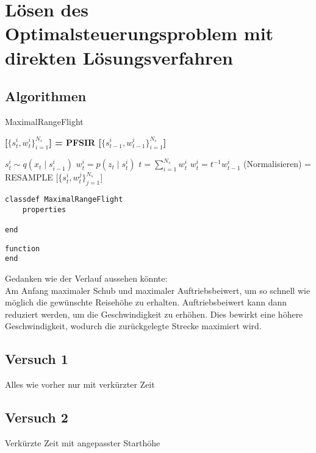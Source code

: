 \chapter{Lösen des Optimalsteuerungsproblem mit direkten Lösungsverfahren}



\section{Algorithmen}
\begin{algorithm}[H]
\caption{MaximalRangeFlight}\label{algo:SISPF}
\textbf{[$\lbrace s^i_t, w^i_t \rbrace^{N_s}_{i=1}$] = PFSIR [$\lbrace s^i_{t-1}, w^i_{t-1} \rbrace^{N_s}_{i=1}$]}
\begin{algorithmic}
\STATE $s^i_t \sim q(x_t \mid s^i_{i-1})$
\STATE $w^i_t = p(z_t \mid s^i_t)$
\ENDFOR
\STATE $t = \sum_{i=1}^{N_s} w^i_t$
\STATE $w^i_t = t^{-1} w^i_{t-1}$ (Normalisieren)
\ENDFOR
\STATE [$\lbrace s^{\ast j}_t, w^{j}_t, i^{j} \rbrace^{N_s}_{j=1}$] = RESAMPLE [$\lbrace s^i_t, w^{j}_t \rbrace^{N_s}_{j=1}$]
\end{algorithmic}

\begin{lstlisting}
classdef MaximalRangeFlight
    properties
        
end
\end{lstlisting}

\end{algorithm}

\begin{lstlisting}
function 
end
\end{lstlisting}



Gedanken wie der Verlauf aussehen könnte:\\
Am Anfang maximaler Schub und maximaler Auftriebsbeiwert, um so schnell wie möglich die gewünschte Reisehöhe zu erhalten. Auftriebsbeiwert kann dann reduziert werden, um die Geschwindigkeit zu erhöhen. Dies bewirkt eine höhere Geschwindigkeit, wodurch die zurückgelegte Strecke maximiert wird.


\section{Versuch 1}
Alles wie vorher nur mit verkürzter Zeit 




\section{Versuch 2}
Verkürzte Zeit mit angepasster Starthöhe


